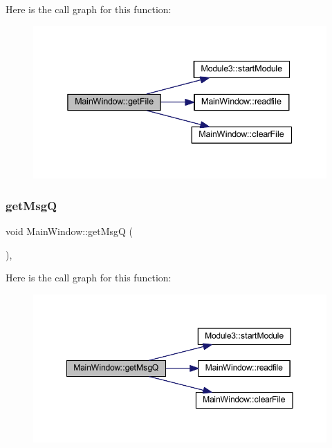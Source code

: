 Here is the call graph for this function\+:
\nopagebreak
\begin{figure}[H]
\begin{center}
\leavevmode
\includegraphics[width=338pt]{class_main_window_ae312fe1c0640df073ef40d7fbab3e1f9_cgraph}
\end{center}
\end{figure}
\mbox{\label{class_main_window_af0e609b7bacc38e1f25151a55b589222}} 
\subsubsection{\texorpdfstring{get\+MsgQ}{getMsgQ}}
{\footnotesize\ttfamily void Main\+Window\+::get\+MsgQ (\begin{DoxyParamCaption}{ }\end{DoxyParamCaption})\hspace{0.3cm}{\ttfamily [private]}, {\ttfamily [slot]}}

Here is the call graph for this function\+:
\nopagebreak
\begin{figure}[H]
\begin{center}
\leavevmode
\includegraphics[width=349pt]{class_main_window_af0e609b7bacc38e1f25151a55b589222_cgraph}
\end{center}
\end{figure}
\mbox{\label{class_main_window_a0b1a3960102da5863d7d31570d2837b7}} 
